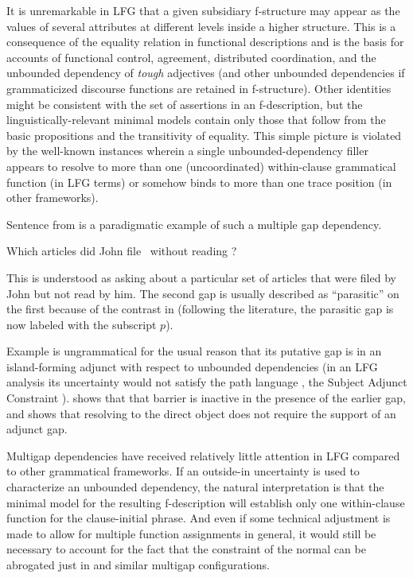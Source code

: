 \documentclass[output=paper,hidelinks]{langscibook}
\begin{document}
It is unremarkable in LFG that a given subsidiary f-structure may appear as the values of several attributes at different levels inside a higher structure.  This is a consequence of the equality relation in functional descriptions and is the basis for accounts of functional control, agreement, distributed coordination, and the unbounded dependency of \textit{tough} adjectives (and other unbounded dependencies if grammaticized discourse functions are retained in f-structure). Other identities might be consistent with the set of assertions in an f-description, but the linguistically-relevant minimal models contain only those that follow from the basic propositions and the transitivity of equality. This simple picture is violated by the well-known instances wherein a single unbounded-dependency filler appears to resolve to more than one (uncoordinated) within-clause grammatical function (in LFG terms) or somehow binds to more than one trace position (in other frameworks).

Sentence  from \citet{Engdahl1983} is a paradigmatic example of such a multiple gap dependency.

\ea\label{pgaps1} Which articles did John file \GAP\ without reading \GAP?
\z


\noindent This is understood as asking about a particular set of articles that were filed by John but not read by him. The second gap is usually described as ``parasitic'' on the first because of the contrast in  (following the literature, the parasitic gap is now labeled with the subscript $p$).

\ea\label{pgaps}
\label{pgaps2}
\label{pgaps3}
\z\z

\noindent Example  is ungrammatical for the usual reason that its putative gap is in an island-forming adjunct with respect to unbounded dependencies (in an LFG analysis its  uncertainty would not satisfy the path language , the Subject Adjunct Constraint ).   shows that that barrier is inactive in the presence of the earlier gap, and  shows that resolving to the direct object does not require the support of an adjunct gap.

Multigap dependencies have received relatively little attention in LFG compared to other grammatical frameworks.  If an outside-in uncertainty is used to characterize an unbounded dependency, the natural interpretation is that the minimal model for the resulting f-description will establish only one within-clause function for the clause-initial phrase. And even if some technical adjustment is made to allow for multiple function assignments in general, it would still be necessary to account for the fact that the  constraint of the normal  can be abrogated just in  and similar multigap configurations.
\end{document}
